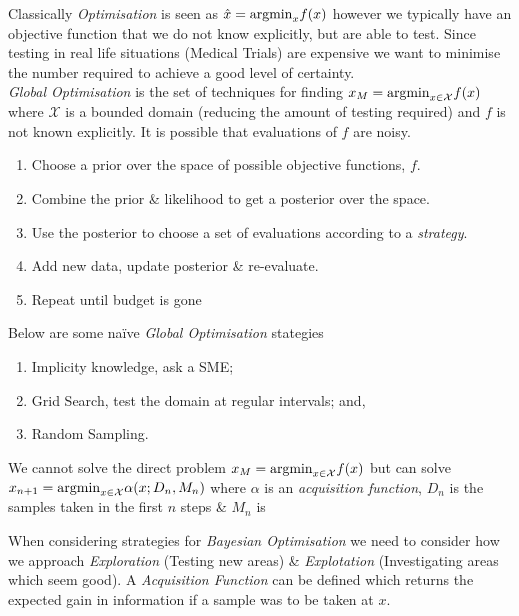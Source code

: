 \documentclass[11pt,a4paper]{article}
\begin{document}
Classically \textit{Optimisation} is seen as $\hat{x}=\mathrm{argmin}_xf(x)$ however we typically have an objective function that we do not know explicitly, but are able to test. Since testing in real life situations (\eg Medical Trials) are expensive we want to minimise the number required to achieve a good level of certainty.\\

\textit{Global Optimisation} is the set of techniques for finding $x_M=\mathrm{argmin}_{x\in\mathcal{X}}f(x)$ where $\mathcal{X}$ is a bounded domain (reducing the amount of testing required) and $f$ is not known explicitly. It is possible that evaluations of $f$ are noisy.\\

\begin{enumerate}[label=\roman*)]
	\item Choose a prior over the space of possible objective functions, $f$.
	\item Combine the prior \& likelihood to get a posterior over the space.
	\item Use the posterior to choose a set of evaluations according to a \textit{strategy}.
	\item Add new data, update posterior \& re-evaluate.
	\item Repeat until budget is gone
\end{enumerate}

Below are some na\"ive \textit{Global Optimisation} stategies
\begin{enumerate}[label=\roman*)]
	\item Implicity knowledge, ask a SME;
	\item Grid Search, test the domain at regular intervals; and,
	\item Random Sampling.
\end{enumerate}

We cannot solve the direct problem $x_M=\mathrm{argmin}_{x\in\mathcal{X}}f(x)$ but can solve $x_{n+1}=\mathrm{argmin}_{x\in\mathcal{X}}\alpha(x;D_n,M_n)$ where $\alpha$ is an \textit{acquisition function}, $D_n$ is the samples taken in the first $n$ steps \& $M_n$ is %

When considering strategies for \textit{Bayesian Optimisation} we need to consider how we approach \textit{Exploration} (Testing new areas) \& \textit{Explotation} (Investigating areas which seem good). A \textit{Acquisition Function} can be defined which returns the expected gain in information if a sample was to be taken at $x$.\\
\end{document}
